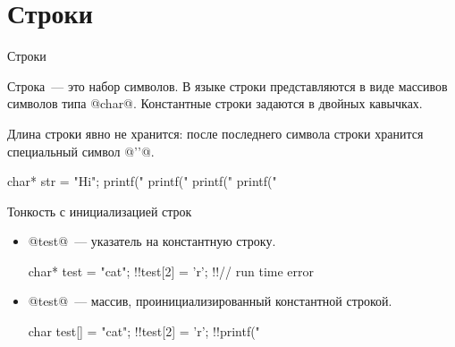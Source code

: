 \section{Строки}

\begin{frame}[fragile]{Строки}

  Строка~--- это набор символов. В языке  строки представляются в виде
  массивов символов типа @char@. Константные строки задаются в двойных
  кавычках.

  \pause
  Длина строки явно не хранится: после последнего символа строки хранится
  специальный символ @'\0'@.

  \pause
  \begin{clisting}
    char* str = "Hi";
    printf("%
    printf("%
    printf("%
    printf("%
  \end{clisting}


\end{frame}

\begin{frame}[fragile]{Тонкость с инициализацией строк}

  \begin{itemize}
    \item
      @test@~--- указатель на константную строку.
      \begin{clisting}[escapechar=!]
        char* test = "cat";
        !!test[2] = 'r'; !!// run time error
      \end{clisting}

    \item
      @test@~--- массив, проинициализированный константной строкой.
      \begin{clisting}[escapechar=!]
        char test[] = "cat";
        !!test[2] = 'r';
        !!printf("%
      \end{clisting}

  \end{itemize}

\end{frame}





